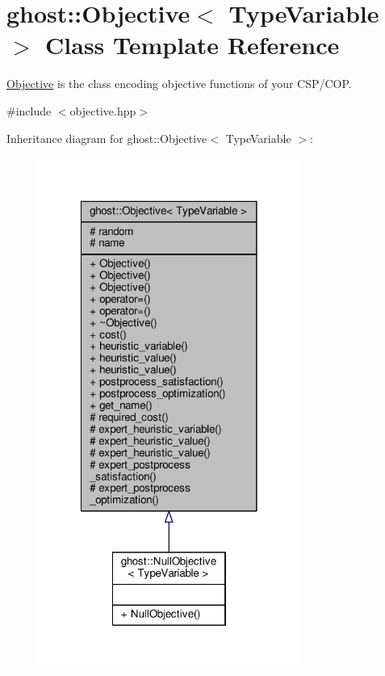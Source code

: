 \hypertarget{classghost_1_1Objective}{\section{ghost\-:\-:Objective$<$ Type\-Variable $>$ Class Template Reference}
\label{classghost_1_1Objective}
}


\hyperlink{classghost_1_1Objective}{Objective} is the class encoding objective functions of your C\-S\-P/\-C\-O\-P.  




{\ttfamily \#include $<$objective.\-hpp$>$}



Inheritance diagram for ghost\-:\-:Objective$<$ Type\-Variable $>$\-:
\nopagebreak
\begin{figure}[H]
\begin{center}
\leavevmode
\includegraphics[width=242pt]{classghost_1_1Objective__inherit__graph}
\end{center}
\end{figure}



